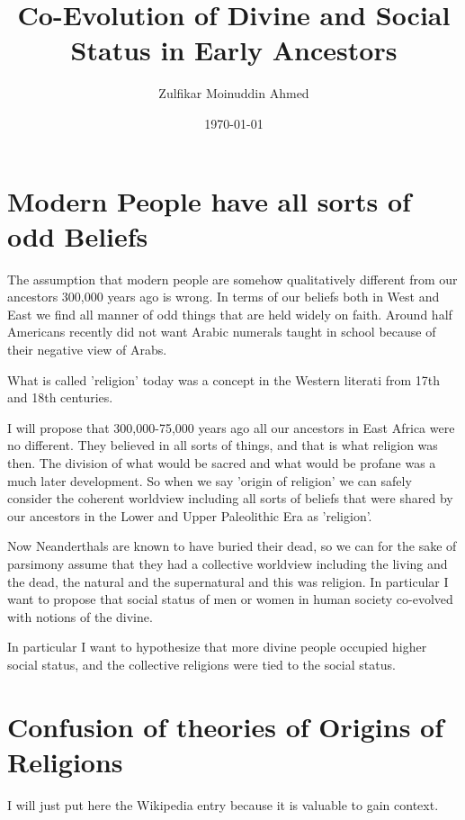 \documentclass{amsart}
\title{Co-Evolution of Divine and Social Status in Early Ancestors}
\author{Zulfikar Moinuddin Ahmed}
\date{\today}
\begin{document}
\maketitle

\section{Modern People have all sorts of odd Beliefs}

The assumption that modern people are somehow qualitatively different from our ancestors 300,000 years ago is wrong.  In terms of our beliefs both in West and East we find all manner of odd things that are held widely on faith.  Around half Americans recently did not want Arabic numerals taught in school because of their negative view of Arabs.  

What is called 'religion' today was a concept in the Western literati from 17th and 18th centuries.  

I will propose that 300,000-75,000 years ago all our ancestors in East Africa were no different.  They believed in all sorts of things, and that is what religion was then.  The division of what would be sacred and what would be profane was a much later development.  So when we say 'origin of religion' we can safely consider the coherent worldview including all sorts of beliefs that were shared by our ancestors in the Lower and Upper Paleolithic Era as 'religion'.  

Now Neanderthals are known to have buried their dead, so we can for the sake of parsimony assume that they had a collective worldview including the living and the dead, the natural and the supernatural and this was religion.  In particular I want to propose that social status of men or women in human society co-evolved with notions of the divine.  

In particular I want to hypothesize that more divine people occupied higher social status, and the collective religions were tied to the social status.

\section{Confusion of theories of Origins of Religions}
I will just put here the Wikipedia entry because it is valuable to gain context.
\end{document}
